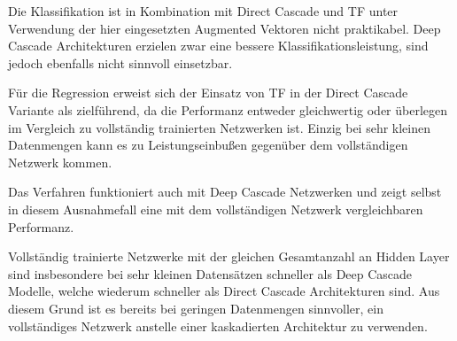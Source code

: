 Die Klassifikation ist in Kombination mit Direct Cascade und TF unter Verwendung der hier eingesetzten Augmented Vektoren nicht praktikabel. 
Deep Cascade Architekturen erzielen zwar eine bessere Klassifikationsleistung, sind jedoch ebenfalls nicht sinnvoll einsetzbar.

Für die Regression erweist sich der Einsatz von TF in der Direct Cascade Variante als zielführend, da die Performanz entweder gleichwertig oder 
überlegen im Vergleich zu vollständig trainierten Netzwerken ist. Einzig bei sehr kleinen Datenmengen kann es zu Leistungseinbußen gegenüber dem 
vollständigen Netzwerk kommen.

Das Verfahren funktioniert auch mit Deep Cascade Netzwerken und zeigt selbst in diesem Ausnahmefall eine mit dem vollständigen Netzwerk 
vergleichbaren Performanz.

Vollständig trainierte Netzwerke mit der gleichen Gesamtanzahl an Hidden Layer sind insbesondere bei sehr kleinen Datensätzen schneller als Deep 
Cascade Modelle, welche wiederum schneller als Direct Cascade Architekturen sind. Aus diesem Grund ist es bereits bei geringen Datenmengen 
sinnvoller, ein vollständiges Netzwerk anstelle einer kaskadierten Architektur zu verwenden.
